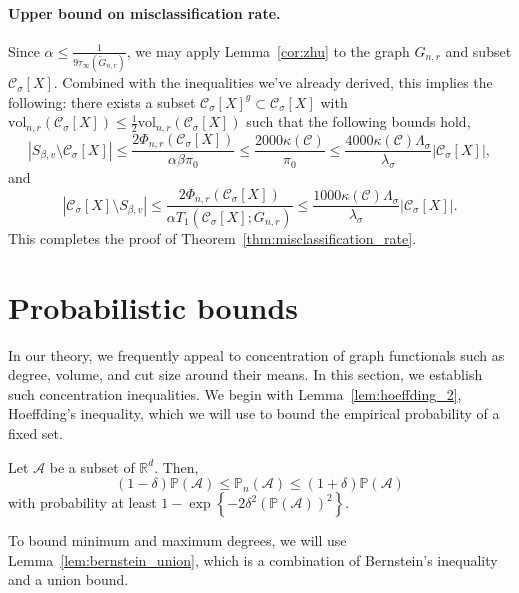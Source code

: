 \documentclass[11pt,twoside]{article}
\newcommand{\set}[1]{\left\{#1\right\}}
\newcommand{\vol}{\mathrm{vol}}
\newcommand{\abs}[1]{\left \lvert #1 \right \rvert}
\newcommand{\Reals}{\mathbb{R}}
\newcommand{\1}{\mathbbm{1}}
\newcommand{\Xbf}{X}
\newcommand{\Pbb}{\mathbb{P}}
\newcommand{\Cset}{\mathcal{C}}
\newcommand{\Csig}{\Cset_{\sigma}}
\begin{document}
\paragraph{Upper bound on misclassification rate.}
Since $\alpha \leq \frac{1}{9\tau_{\infty}(\widetilde{G}_{n,r})}$, we may apply Lemma~\ref{cor:zhu} to the graph $G_{n,r}$ and subset $\Csig[\Xbf]$. Combined with the inequalities we've already derived, this implies the following: there exists a subset $\Csig[\Xbf]^g \subset \Csig[\Xbf]$ with $\vol_{n,r}(\Csig[\Xbf]) \leq \frac{1}{2}\vol_{n,r}(\Csig[\Xbf])$ such that the following bounds hold,
\begin{equation*}
\abs{S_{\beta,v} \setminus \Csig[\Xbf]} \leq \frac{2\Phi_{n,r}(\Csig[\Xbf])}{\alpha \beta \pi_0} \leq \frac{2000 \kappa(\Cset)}{\pi_0} \leq \frac{4000 \kappa(\Cset) \Lambda_{\sigma}}{\lambda_{\sigma}}\abs{\Csig[\Xbf]},
\end{equation*}
and
\begin{equation*}
\abs{\Csig[\Xbf] \setminus S_{\beta,v}} \leq \frac{2\Phi_{n,r}(\Csig[\Xbf])}{\alpha T_1(\Csig[\Xbf];G_{n,r})} \leq \frac{1000 \kappa(\Cset) \Lambda_{\sigma}}{\lambda_{\sigma}}\abs{\Csig[\Xbf]}.
\end{equation*}
This completes the proof of Theorem~\ref{thm:misclassification_rate}.

\section{Probabilistic bounds}
\label{sec: concentration}

In our theory, we frequently appeal to concentration of graph functionals such as degree, volume, and cut size around their means. In this section, we establish such concentration inequalities. We begin with Lemma~\ref{lem:hoeffding_2}, Hoeffding's inequality, which we will use to bound the empirical probability of a fixed set.
\begin{lemma}
	\label{lem:hoeffding_2}
	Let $\mathcal{A}$ be a subset of $\Reals^d$. Then,
	\begin{equation*}
	(1 - \delta) \Pbb(\mathcal{A}) \leq \Pbb_n(\mathcal{A}) \leq (1 + \delta)\Pbb(\mathcal{A})
	\end{equation*}
	with probability at least $1 - \exp\set{-2\delta^2(\Pbb(\mathcal{A}))^2}$. 
\end{lemma}

To bound minimum and maximum degrees, we will use Lemma~\ref{lem:bernstein_union}, which is a combination of Bernstein's inequality and a union bound.
\end{document}
